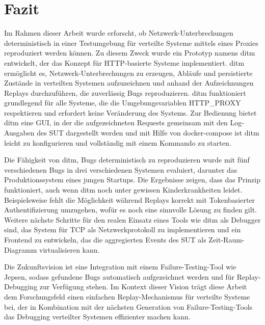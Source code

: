 \documentclass[12pt,a4paper]{report}
\begin{document}
\chapter{Fazit}
Im Rahmen dieser Arbeit wurde erforscht, ob Netzwerk-Unterbrechungen deterministisch in einer Testumgebung für verteilte Systeme
mittels eines Proxies reproduziert werden können. Zu diesem Zweck wurde ein Prototyp namens ditm entwickelt, der das Konzept für
HTTP-basierte Systeme implementiert. ditm ermöglicht es, Netzwerk-Unterbrechungen zu erzeugen, Abläufe und persistierte Zustände
in verteilten Systemen aufzuzeichnen und anhand der Aufzeichnungen Replays durchzuführen, die zuverlässig Bugs reproduzieren. ditm
funktioniert grundlegend für alle Systeme, die die Umgebungsvariablen HTTP\_PROXY respektieren und erfordert keine Veränderung des
Systems. Zur Bedienung bietet ditm eine GUI, in der die aufgezeichneten Requests gemeinsam mit den Log-Ausgaben des SUT
dargestellt werden und mit Hilfe von docker-compose ist ditm leicht zu konfigurieren und vollständig mit einem Kommando zu starten.

Die Fähigkeit von ditm, Bugs deterministisch zu reproduzieren wurde mit fünf verschiedenen Bugs in drei verschiedenen Systemen
evaluiert, darunter das Produktionssystem eines jungen Startups. Die Ergebnisse zeigen, dass das Prinzip funktioniert, auch wenn
ditm noch unter gewissen Kinderkrankheiten leidet. Beispielsweise fehlt die Möglichkeit während Replays korrekt mit Tokenbasierter
Authentifizierung umzugehen, wofür es noch eine sinnvolle Lösung zu finden gilt. Weitere nächste Schritte für den realen Einsatz
eines Tools wie ditm als Debugger sind, das System für TCP als Netzwerkprotokoll zu implementieren und ein Frontend zu entwickeln,
das die aggregierten Events des SUT als Zeit-Raum-Diagramm virtualisieren kann.

Die Zukunftsvision ist eine Integration mit einem Failure-Testing-Tool wie Jepsen, sodass gefundene Bugs automatisch
aufgezeichnet werden und für Replay-Debugging zur Verfügung stehen. Im Kontext dieser Vision trägt diese Arbeit dem
Forschungsfeld einen einfachen Replay-Mechanismus für verteilte Systeme bei, der in Kombination mit der nächsten Generation von
Failure-Testing-Tools das Debugging verteilter Systemen effizienter machen kann.

% 
% 

\printbibliography
\end{document}
